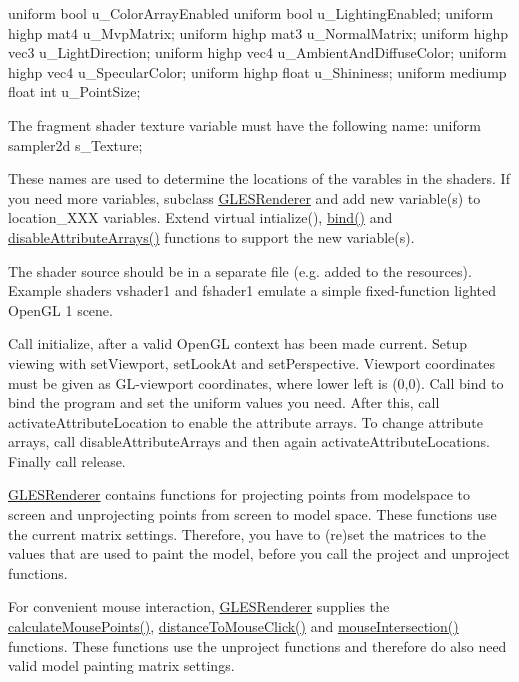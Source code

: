 uniform bool u\+\_\+\+Color\+Array\+Enabled uniform bool u\+\_\+\+Lighting\+Enabled; uniform highp mat4 u\+\_\+\+Mvp\+Matrix; uniform highp mat3 u\+\_\+\+Normal\+Matrix; uniform highp vec3 u\+\_\+\+Light\+Direction; uniform highp vec4 u\+\_\+\+Ambient\+And\+Diffuse\+Color; uniform highp vec4 u\+\_\+\+Specular\+Color; uniform highp float u\+\_\+\+Shininess; uniform mediump float int u\+\_\+\+Point\+Size;

The fragment shader texture variable must have the following name\+: uniform sampler2d s\+\_\+\+Texture;

These names are used to determine the locations of the varables in the shaders. If you need more variables, subclass \mbox{\hyperlink{class_g_l_e_s_renderer}{G\+L\+E\+S\+Renderer}} and add new variable(s) to location\+\_\+\+X\+XX variables. Extend virtual intialize(), \mbox{\hyperlink{class_g_l_e_s_renderer_a41d040c7fa439552abf339b3883b02f4}{bind()}} and \mbox{\hyperlink{class_g_l_e_s_renderer_a0978cd1fe3baab589b7bfbcde6554c15}{disable\+Attribute\+Arrays()}} functions to support the new variable(s).

The shader source should be in a separate file (e.\+g. added to the resources). Example shaders vshader1 and fshader1 emulate a simple fixed-\/function lighted Open\+GL 1 scene.

Call initialize, after a valid Open\+GL context has been made current. Setup viewing with set\+Viewport, set\+Look\+At and set\+Perspective. Viewport coordinates must be given as G\+L-\/viewport coordinates, where lower left is (0,0). Call bind to bind the program and set the uniform values you need. After this, call activate\+Attribute\+Location to enable the attribute arrays. To change attribute arrays, call disable\+Attribute\+Arrays and then again activate\+Attribute\+Locations. Finally call release.

\mbox{\hyperlink{class_g_l_e_s_renderer}{G\+L\+E\+S\+Renderer}} contains functions for projecting points from modelspace to screen and unprojecting points from screen to model space. These functions use the current matrix settings. Therefore, you have to (re)set the matrices to the values that are used to paint the model, before you call the project and unproject functions.

For convenient mouse interaction, \mbox{\hyperlink{class_g_l_e_s_renderer}{G\+L\+E\+S\+Renderer}} supplies the \mbox{\hyperlink{class_g_l_e_s_renderer_ae600d289f94594374cdbd8c031cb0c86}{calculate\+Mouse\+Points()}}, \mbox{\hyperlink{class_g_l_e_s_renderer_a6f31b6893897549f3762a88a8bf135f8}{distance\+To\+Mouse\+Click()}} and \mbox{\hyperlink{class_g_l_e_s_renderer_a2c8f6b6ff0df6acafc6cbd7a82678a17}{mouse\+Intersection()}} functions. These functions use the unproject functions and therefore do also need valid model painting matrix settings. 

